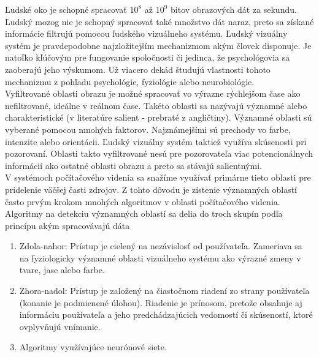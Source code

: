 
Ľudské oko je schopné spracovať \begin{math}10^8\end{math} až \begin{math}10^9\end{math} bitov obrazových dát za sekundu.
Ľudský mozog nie je schopný spracovať také množstvo dát naraz, preto sa získané informácie filtrujú pomocou ľudského vizuálneho systému\cite{Fmph-videnie}.
Ľudský vizuálny systém je pravdepodobne najzložitejším mechanizmom akým človek disponuje.
Je natoľko kľúčovým pre fungovanie spoločnosti či jedinca, že psychológovia sa zaoberajú jeho výskumom.
Už viacero dekád študujú vlastnosti tohoto mechanizmu z pohľadu psychológie, fyziológie alebo neurobiológie.
\\
Vyfiltrované oblasti obrazu je možné spracovať vo výrazne rýchlejšom čase ako nefiltrované, ideálne v reálnom čase.
Takéto oblasti sa nazývajú významné alebo charakteristické (v literatúre salient - prebraté z angličtiny).
Významné oblasti sú vyberané pomocou mnohých faktorov.
Najznámejšími sú prechody vo farbe, intenzite alebo orientácii.
Ľudský vizuálny systém taktiež využíva skúsenosti pri pozorovaní.
Oblasti takto vyfiltrované nesú pre pozorovateľa viac potencionálnych informácií ako ostatné oblasti obrazu a preto sa stávajú salientnými.
\\
V systémoch počítačového videnia sa snažíme využívať primárne tieto oblasti pre pridelenie väčšej časti zdrojov.
Z tohto dôvodu je zistenie významných oblastí často prvým krokom mnohých algoritmov v oblasti počítačového videnia.
\\
Algoritmy na detekciu významných oblastí sa delia do troch skupín podľa princípu akým spracovávajú dáta\cite{brief-survey}

  \begin{enumerate}
          \item Zdola-nahor: Prístup je cielený na nezávislosť od používateľa.
          Zameriava sa na fyziologicky významné oblasti vizuálneho systému ako výrazné zmeny v tvare, jase alebo farbe.
          \item Zhora-nadol: Prístup je založený na čiastočnom riadení zo strany používateľa (konanie je podmienené úlohou).
          Riadenie je prínosom, pretože obsahuje aj informáciu používateľa a jeho predchádzajúcich vedomostí či skúseností, ktoré ovplyvňujú vnímanie.
          \item Algoritmy využívajúce neurónové siete.
  \end{enumerate}

